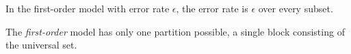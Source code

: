\documentclass[ ../main.tex]{subfiles}
\begin{document}
In the first-order model with error rate $\epsilon$, the error rate is $\epsilon$ over every subset.


The \emph{first-order} model has only one partition possible, a single block consisting of the universal set.
\end{document}
